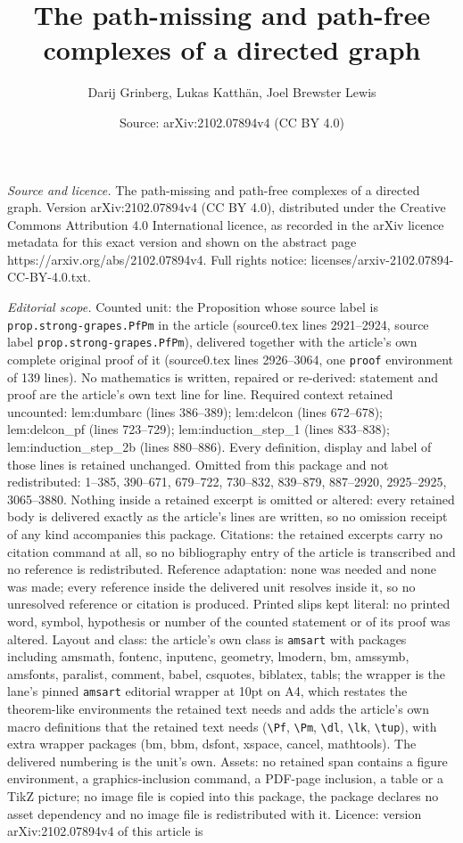 \documentclass[10pt,a4paper]{amsart}
\title[The path-missing and path-free complexes of a directed graph]{The path-missing and path-free complexes of a directed graph}
\author{Darij Grinberg, Lukas Katth\"an, Joel Brewster Lewis}
\date{Source: arXiv:2102.07894v4 (CC BY 4.0)}
\begin{document}
\maketitle

\noindent\emph{Source and licence.} The path-missing and path-free complexes of a directed graph. Version arXiv:2102.07894v4 (CC BY 4.0), distributed under the Creative Commons Attribution 4.0 International licence, as recorded in the arXiv licence metadata for this exact version and shown on the abstract page https://arxiv.org/abs/2102.07894v4. Full rights notice: licenses/arxiv-2102.07894-CC-BY-4.0.txt.\par\smallskip

\noindent\textit{Editorial scope.} Counted unit: the Proposition whose source label is \texttt{prop.strong-grapes.PfPm} in the article (source0.tex lines 2921--2924, source label \texttt{prop.strong-grapes.PfPm}), delivered together with the article's own complete original proof of it (source0.tex lines 2926--3064, one \texttt{proof} environment of 139 lines). No mathematics is written, repaired or re-derived: statement and proof are the article's own text line for line. Required context retained uncounted: lem:dumbarc (lines 386--389); lem:delcon (lines 672--678); lem:delcon\_pf (lines 723--729); lem:induction\_step\_1 (lines 833--838); lem:induction\_step\_2b (lines 880--886). Every definition, display and label of those lines is retained unchanged. Omitted from this package and not redistributed: 1--385, 390--671, 679--722, 730--832, 839--879, 887--2920, 2925--2925, 3065--3880. Nothing inside a retained excerpt is omitted or altered: every retained body is delivered exactly as the article's lines are written, so no omission receipt of any kind accompanies this package. Citations: the retained excerpts carry no citation command at all, so no bibliography entry of the article is transcribed and no reference is redistributed. Reference adaptation: none was needed and none was made; every reference inside the delivered unit resolves inside it, so no unresolved reference or citation is produced. Printed slips kept literal: no printed word, symbol, hypothesis or number of the counted statement or of its proof was altered. Layout and class: the article's own class is \texttt{amsart} with packages including amsmath, fontenc, inputenc, geometry, lmodern, bm, amssymb, amsfonts, paralist, comment, babel, csquotes, biblatex, tabls; the wrapper is the lane's pinned \texttt{amsart} editorial wrapper at 10pt on A4, which restates the theorem-like environments the retained text needs and adds the article's own macro definitions that the retained text needs (\texttt{\textbackslash Pf}, \texttt{\textbackslash Pm}, \texttt{\textbackslash dl}, \texttt{\textbackslash lk}, \texttt{\textbackslash tup}), with extra wrapper packages (bm, bbm, dsfont, xspace, cancel, mathtools). The delivered numbering is the unit's own. Assets: no retained span contains a figure environment, a graphics-inclusion command, a PDF-page inclusion, a table or a TikZ picture; no image file is copied into this package, the package declares no asset dependency and no image file is redistributed with it. Licence: version arXiv:2102.07894v4 of this article is 
\end{document}
